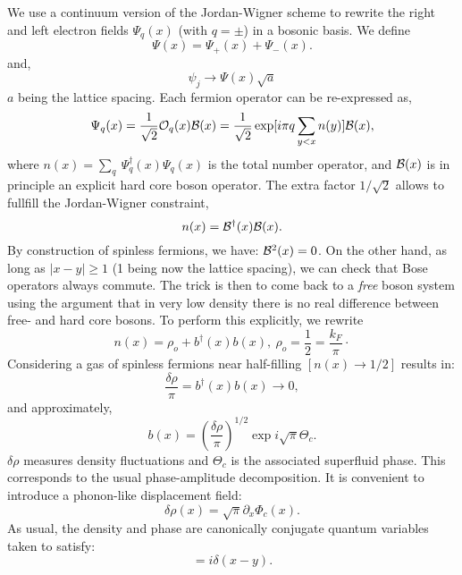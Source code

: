 We use a continuum
version of the Jordan-Wigner scheme to rewrite
the right and left electron fields $\Psi_q(x)$ (with $q=\pm$)
in a bosonic basis. We define
\begin{equation}
\Psi(x)=\Psi_+(x)+\Psi_-(x).
\end{equation}
and,
\begin{equation}
\psi_j\rightarrow \Psi(x)\sqrt{a}
\end{equation}
$a$ being the lattice spacing.
Each
fermion operator can be re-expressed as,
\begin{equation}
\Psi_q(x)=\frac{1}{\sqrt{2}}{\cal O}_q(x){\cal B}(x)=
\frac{1}{\sqrt{2}}\exp[i\pi q\sum_{y<x} n(y)]{\cal B}(x),
\end{equation}
where $n(x)=\sum_q\ \Psi_q^{\dag}(x)\Psi_q(x)$ is the total number operator, 
and ${\cal B}(x)$ is in principle
an explicit hard core boson operator. The extra
factor $1/\sqrt{2}$ allows
to fullfill the Jordan-Wigner constraint,
\begin{equation}
n(x)={\cal B}^{\dag}(x){\cal B}(x).
\end{equation}
By
construction of spinless fermions, we have: ${\cal B}^2(x)=0$. 
On the
other hand, as long as $\left|x-y\right|\geq 1$
(1 being now the lattice spacing), we can 
check that Bose operators always commute.
The trick is then to come back to a {\it free} boson system using the argument
that in very low density there is no real
difference between free- and hard
core bosons. To perform this explicitly, we rewrite
\begin{equation}
n(x)=\rho_o+b^{\dag}(x)b(x),\ \rho_o=\frac{1}{2}=\frac{k_F}{\pi}\cdot
\end{equation}
Considering a gas of spinless fermions near half-filling $[n(x)\rightarrow
1/2]$ results in:
\begin{equation}
\frac{\delta\rho}{\pi}=b^{\dag}(x)b(x)\rightarrow 0,
\end{equation}
and approximately,
\begin{equation}
b(x)=(\frac{\delta\rho}{\pi})^{1/2}\exp i\sqrt{\pi}\Theta_c.
\end{equation}
$\delta\rho$ measures density fluctuations and $\Theta_c$ is the
associated superfluid phase. This corresponds to the usual phase-amplitude
decomposition. It is convenient to introduce a phonon-like 
displacement field:
\begin{equation}
\delta\rho(x)=\sqrt{\pi}\partial_x\Phi_c(x).
\end{equation}
As usual, the density and phase are canonically conjugate quantum variables
taken to satisfy:
\begin{equation}
[\Theta_c(x),\partial_y\Phi_c(y)]=i\delta(x-y).
\end{equation}

